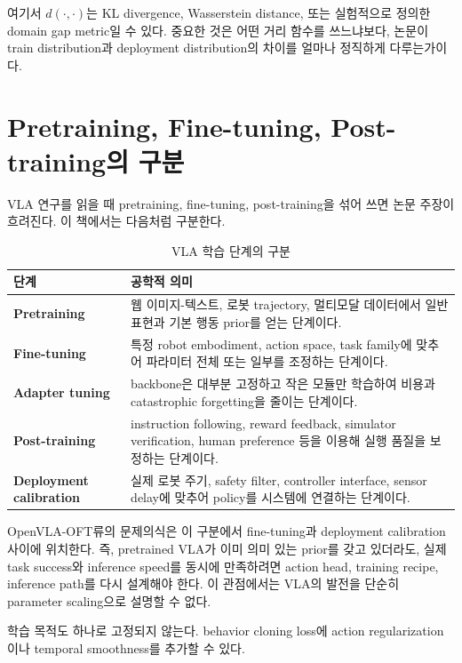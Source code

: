 여기서 $d(\cdot,\cdot)$는 KL divergence, Wasserstein distance, 또는 실험적으로 정의한 domain gap metric일 수 있다. 중요한 것은 어떤 거리 함수를 쓰느냐보다, 논문이 train distribution과 deployment distribution의 차이를 얼마나 정직하게 다루는가이다.

\section{Pretraining, Fine-tuning, Post-training의 구분}

VLA 연구를 읽을 때 pretraining, fine-tuning, post-training을 섞어 쓰면 논문 주장이 흐려진다. 이 책에서는 다음처럼 구분한다.

\begin{table}[t]
  \centering
  \caption{VLA 학습 단계의 구분}
  \label{tab:training_stages}
  \begin{tabularx}{\textwidth}{>{\bfseries}p{31mm}X}
    \toprule
    단계 & 공학적 의미 \\
    \midrule
    Pretraining & 웹 이미지-텍스트, 로봇 trajectory, 멀티모달 데이터에서 일반 표현과 기본 행동 prior를 얻는 단계이다. \\
    Fine-tuning & 특정 robot embodiment, action space, task family에 맞추어 파라미터 전체 또는 일부를 조정하는 단계이다. \\
    Adapter tuning & backbone은 대부분 고정하고 작은 모듈만 학습하여 비용과 catastrophic forgetting을 줄이는 단계이다. \\
    Post-training & instruction following, reward feedback, simulator verification, human preference 등을 이용해 실행 품질을 보정하는 단계이다. \\
    Deployment calibration & 실제 로봇 주기, safety filter, controller interface, sensor delay에 맞추어 policy를 시스템에 연결하는 단계이다. \\
    \bottomrule
  \end{tabularx}
\end{table}

OpenVLA-OFT류의 문제의식은 이 구분에서 fine-tuning과 deployment calibration 사이에 위치한다. 즉, pretrained VLA가 이미 의미 있는 prior를 갖고 있더라도, 실제 task success와 inference speed를 동시에 만족하려면 action head, training recipe, inference path를 다시 설계해야 한다. 이 관점에서는 VLA의 발전을 단순히 parameter scaling으로 설명할 수 없다.

학습 목적도 하나로 고정되지 않는다. behavior cloning loss에 action regularization이나 temporal smoothness를 추가할 수 있다.

